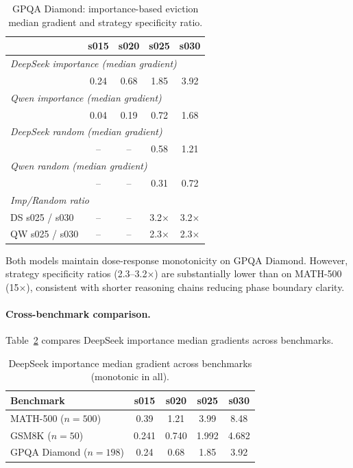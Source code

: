 \documentclass[11pt,a4paper]{article}
\begin{document}
\begin{table}[h]
\centering
\caption{GPQA Diamond: importance-based eviction median gradient and strategy specificity ratio.}
\label{tab:gpqa}
\begin{tabular}{lcccc}
\toprule
& \textbf{s015} & \textbf{s020} & \textbf{s025} & \textbf{s030} \\
\midrule
\multicolumn{5}{l}{\emph{DeepSeek importance (median gradient)}} \\
& 0.24 & 0.68 & 1.85 & 3.92 \\
\midrule
\multicolumn{5}{l}{\emph{Qwen importance (median gradient)}} \\
& 0.04 & 0.19 & 0.72 & 1.68 \\
\midrule
\multicolumn{5}{l}{\emph{DeepSeek random (median gradient)}} \\
& -- & -- & 0.58 & 1.21 \\
\midrule
\multicolumn{5}{l}{\emph{Qwen random (median gradient)}} \\
& -- & -- & 0.31 & 0.72 \\
\midrule
\multicolumn{5}{l}{\emph{Imp/Random ratio}} \\
DS s025 / s030 & -- & -- & 3.2$\times$ & 3.2$\times$ \\
QW s025 / s030 & -- & -- & 2.3$\times$ & 2.3$\times$ \\
\bottomrule
\end{tabular}
\end{table}

Both models maintain dose-response monotonicity on GPQA Diamond. However, strategy specificity ratios (2.3--3.2$\times$) are substantially lower than on MATH-500 (15$\times$), consistent with shorter reasoning chains reducing phase boundary clarity.

\paragraph{Cross-benchmark comparison.} Table~\ref{tab:cross_bench} compares DeepSeek importance median gradients across benchmarks.

\begin{table}[h]
\centering
\caption{DeepSeek importance median gradient across benchmarks (monotonic in all).}
\label{tab:cross_bench}
\begin{tabular}{lcccc}
\toprule
\textbf{Benchmark} & \textbf{s015} & \textbf{s020} & \textbf{s025} & \textbf{s030} \\
\midrule
MATH-500 ($n=500$) & 0.39 & 1.21 & 3.99 & 8.48 \\
GSM8K ($n=50$) & 0.241 & 0.740 & 1.992 & 4.682 \\
GPQA Diamond ($n=198$) & 0.24 & 0.68 & 1.85 & 3.92 \\
\bottomrule
\end{tabular}
\end{table}
\end{document}
